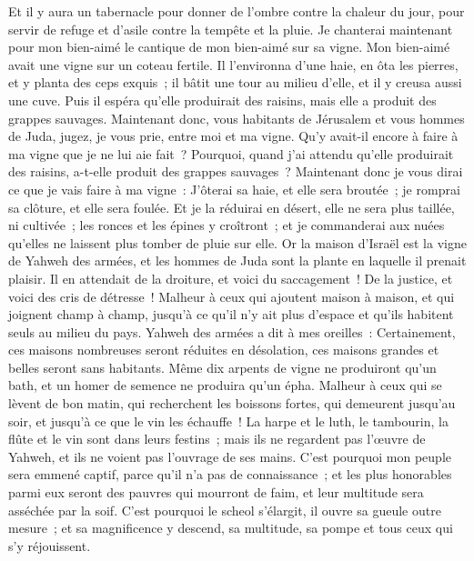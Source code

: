 \begin{multicols}{2}
Et il y aura un tabernacle pour donner de l'ombre contre la chaleur du jour, pour servir de refuge et d'asile contre la tempête et la pluie.
\VerseOne{}Je chanterai maintenant pour mon bien-aimé le cantique de mon bien-aimé sur sa vigne. Mon bien-aimé avait une vigne sur un coteau fertile.
Il l'environna d'une haie, en ôta les pierres, et y planta des ceps exquis~; il bâtit une tour au milieu d'elle, et il y creusa aussi une cuve. Puis il espéra qu'elle produirait des raisins, mais elle a produit des grappes sauvages.
Maintenant donc, vous habitants de Jérusalem et vous hommes de Juda, jugez, je vous prie, entre moi et ma vigne.
Qu'y avait-il encore à faire à ma vigne que je ne lui aie fait~? Pourquoi, quand j'ai attendu qu'elle produirait des raisins, a-t-elle produit des grappes sauvages~?
Maintenant donc je vous dirai ce que je vais faire à ma vigne~: J'ôterai sa haie, et elle sera broutée~; je romprai sa clôture, et elle sera foulée.
Et je la réduirai en désert, elle ne sera plus taillée, ni cultivée~; les ronces et les épines y croîtront~; et je commanderai aux nuées qu'elles ne laissent plus tomber de pluie sur elle.
Or la maison d'Israël est la vigne de Yahweh des armées, et les hommes de Juda sont la plante en laquelle il prenait plaisir. Il en attendait de la droiture, et voici du saccagement~! De la justice, et voici des cris de détresse~!
Malheur à ceux qui ajoutent maison à maison, et qui joignent champ à champ, jusqu'à ce qu'il n'y ait plus d'espace et qu'ils habitent seuls au milieu du pays.
Yahweh des armées a dit à mes oreilles~: Certainement, ces maisons nombreuses seront réduites en désolation, ces maisons grandes et belles seront sans habitants.
Même dix arpents de vigne ne produiront qu'un bath, et un homer de semence ne produira qu'un épha.
Malheur à ceux qui se lèvent de bon matin, qui recherchent les boissons fortes, qui demeurent jusqu'au soir, et jusqu'à ce que le vin les échauffe~!
La harpe et le luth, le tambourin, la flûte et le vin sont dans leurs festins~; mais ils ne regardent pas l'œuvre de Yahweh, et ils ne voient pas l'ouvrage de ses mains.
C'est pourquoi mon peuple sera emmené captif, parce qu'il n'a pas de connaissance~; et les plus honorables parmi eux seront des pauvres qui mourront de faim, et leur multitude sera asséchée par la soif.
C'est pourquoi le scheol s'élargit, il ouvre sa gueule outre mesure~; et sa magnificence y descend, sa multitude, sa pompe et tous ceux qui s'y réjouissent.

\end{multicols}

